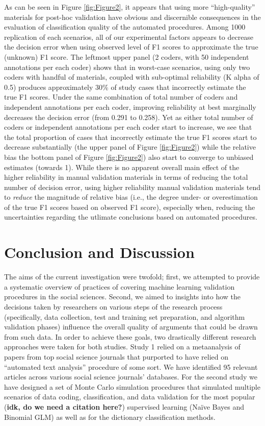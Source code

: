 \documentclass[man, 12pt, a4paper, nolmodern, noextraspace]{apa6}
\begin{document}
As can be seen in Figure \ref{fig:Figure2}, it appears that using more \enquote{high-quality} materials for post-hoc validation have obvious and discernible consequences in the evaluation of classification quality of the automated procedures. Among 1000 replication of each scenarios, all of our experimental factors appears to decrease the decision error when using observed level of F1 scores to approximate the true (unknown) F1 score. The leftmost upper panel (2 coders, with 50 independent annotations per each coder) shows that in worst-case scenarios, using only two coders with handful of materials, coupled with sub-optimal reliability (K alpha of 0.5) produces approximately 30\% of study cases that incorrectly estimate the true F1 scores. Under the same combination of total number of coders and independent annotations per each coder, improving reliability at best marginally decreases the decision error (from 0.291 to 0.258). Yet as either total number of coders or independent annotations per each coder start to increase, we see that the total proportion of cases that incorrectly estimate the true F1 scores start to decrease substantially (the upper panel of Figure \ref{fig:Figure2}) while the relative bias the bottom panel of Figure \ref{fig:Figure2}) also start to converge to unbiased estimates (towards 1). While there is no apparent overall main effect of the higher reliability in manual validation materials in terms of reducing the total number of decision error, using higher reliability manual validation materials tend to \textit{reduce} the magnitude of relative bias (i.e., the degree under- or overestimation of the true F1 scores based on observed F1 score),  especially when, reducing the uncertainties regarding the utlimate conclusions based on automated procedures.            


\section{Conclusion and Discussion}



The aims of the current investigation were twofold; first, we attempted to provide a systematic overview of practices of covering machine learning validation procedures in the social sciences. Second, we aimed to insights into how the decisions taken by researchers on various steps of the research process (specifically, data collection, test and training set preparation, and algorithm validation phases) influence the overall quality of arguments that could be drawn from such data. In order to achieve these goals, two drastically different research approaches were taken for both studies. Study 1 relied on a metaanalysis of papers from top social science journals that purported to have relied on ``automated text analysis'' procedure of some sort. We have identified 95 relevant articles across various social science journals' databases. For the second study we have designed a set of Monte Carlo simulation procedures that simulated multiple scenarios of data coding, classification, and data validation for the most popular (\textbf{idk, do we need a citation here?}) supervised learning  (Naïve Bayes and Binomial GLM) as well as for the dictionary classification methods.
\end{document}

